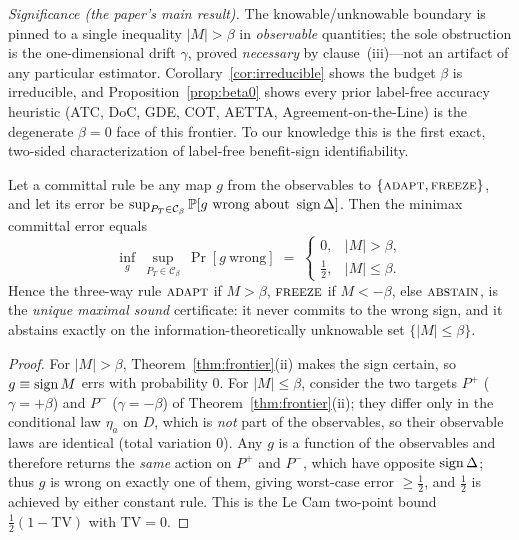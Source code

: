 \smallskip\noindent\emph{Significance (the paper's main result).} The knowable/unknowable
boundary is pinned to a single inequality $|M|>\beta$ in \emph{observable} quantities; the sole
obstruction is the one-dimensional drift $\gamma$, proved \emph{necessary} by clause~(iii)---not an
artifact of any particular estimator. Corollary~\ref{cor:irreducible} shows the budget $\beta$ is
irreducible, and Proposition~\ref{prop:beta0} shows every prior label-free accuracy heuristic
(ATC, DoC, GDE, COT, AETTA, Agreement-on-the-Line) is the degenerate $\beta{=}0$ face of this
frontier. To our knowledge this is the first exact, two-sided characterization of label-free
benefit-sign identifiability.

\begin{proposition}\label{thm:minimax}
Let a committal rule be any map $g$ from the observables to $\{\textsc{adapt},\textsc{freeze}\}$,
and let its error be $\sup_{P_T\in\mathcal C_\beta}\mathbb{P}[g\ \text{wrong about }\operatorname{sign}\Delta]$.
Then the minimax committal error equals
\[
  \inf_g\ \sup_{P_T\in\mathcal C_\beta}\ \Pr[g\ \text{wrong}]
  \;=\;
  \begin{cases} 0,& |M|>\beta,\\[2pt] \tfrac12,& |M|\le\beta.\end{cases}
\]
Hence the three-way rule
$\textsc{adapt}$ if $M>\beta$, $\textsc{freeze}$ if $M<-\beta$, else $\textsc{abstain}$,
is the \emph{unique maximal sound} certificate: it never commits to the wrong sign, and it
abstains exactly on the information-theoretically unknowable set $\{|M|\le\beta\}$.
\end{proposition}
\begin{proof}
For $|M|>\beta$, Theorem~\ref{thm:frontier}(ii) makes the sign certain, so $g\equiv\operatorname{sign} M$
errs with probability $0$. For $|M|\le\beta$, consider the two targets $P^+$ ($\gamma=+\beta$)
and $P^-$ ($\gamma=-\beta$) of Theorem~\ref{thm:frontier}(ii); they differ only in the
conditional law $\eta_a$ on $D$, which is \emph{not} part of the observables, so their
observable laws are identical (total variation $0$). Any $g$ is a function of the
observables and therefore returns the \emph{same} action on $P^+$ and $P^-$, which have
opposite $\operatorname{sign}\Delta$; thus $g$ is wrong on exactly one of them, giving worst-case error
$\ge\tfrac12$, and $\tfrac12$ is achieved by either constant rule. This is the Le Cam
two-point bound $\tfrac12(1-\mathrm{TV})$ with $\mathrm{TV}=0$.
\end{proof}

